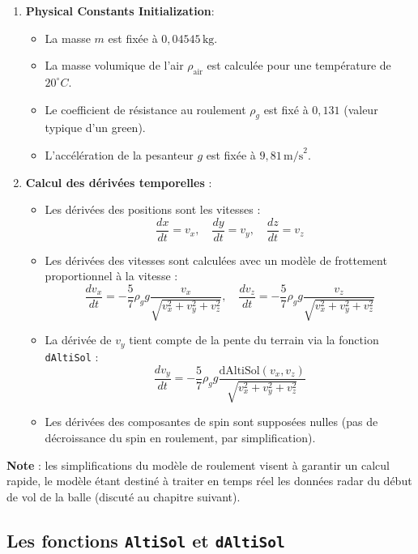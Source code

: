 \documentclass[10pt,a4paper]{report}
\begin{document}
\begin{enumerate}
    \item \textbf{Physical Constants Initialization}:
    \begin{itemize}
        \item La masse \(m\) est fixée à \(0{,}04545 \, \text{kg}\).
        \item La masse volumique de l'air \(\rho_{\text{air}}\) est calculée pour une température de \(20^\circ C\).
        \item Le coefficient de résistance au roulement \(\rho_g\) est fixé à \(0{,}131\) (valeur typique d'un green).
        \item L'accélération de la pesanteur \(g\) est fixée à \(9{,}81 \, \text{m/s}^2\).
    \end{itemize}

    \item \textbf{Calcul des dérivées temporelles} :
    \begin{itemize}
        \item Les dérivées des positions sont les vitesses :
        \[
        \frac{dx}{dt} = v_x, \quad \frac{dy}{dt} = v_y, \quad \frac{dz}{dt} = v_z
        \]
        \item Les dérivées des vitesses sont calculées avec un modèle de frottement proportionnel à la vitesse :
        \[
        \frac{dv_x}{dt} = -\frac{5}{7} \rho_g g \frac{v_x}{\sqrt{v_x^2 + v_y^2 + v_z^2}}, \quad \frac{dv_z}{dt} = -\frac{5}{7} \rho_g g \frac{v_z}{\sqrt{v_x^2 + v_y^2 + v_z^2}}
        \]
        \item La dérivée de \(v_y\) tient compte de la pente du terrain via la fonction \texttt{dAltiSol} :
        \[
        \frac{dv_y}{dt} = -\frac{5}{7} \rho_g g \frac{\text{dAltiSol}(v_x, v_z)}{\sqrt{v_x^2 + v_y^2 + v_z^2}}
        \]
        \item Les dérivées des composantes de spin sont supposées nulles (pas de décroissance du spin en roulement, par simplification).
    \end{itemize}
\end{enumerate}

\textbf{Note} : les simplifications du modèle de roulement visent à garantir un calcul rapide, le modèle étant destiné à traiter en temps réel les données radar du début de vol de la balle (discuté au chapitre suivant).

\bigskip
\subsection{Les fonctions \texttt{AltiSol} et \texttt{dAltiSol}}
\label{subsec:altisol_daltisol}
\end{document}
